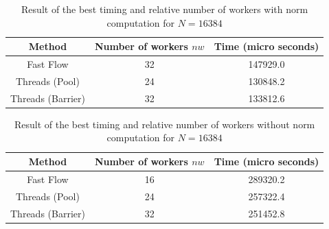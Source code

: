 \documentclass[12pt]{extarticle}
\begin{document}
\begin{table}[H]
\setlength{\tabcolsep}{10pt} %
\renewcommand{\arraystretch}{1.2} %
\centering
\begin{tabular}{|ccc|}
\hline
\multicolumn{1}{|c||}{Method}   & \multicolumn{1}{c|}{Number of workers $nw$}    & \multicolumn{1}{c|}{Time (micro seconds)} \\ \hline
\multicolumn{1}{|c||}{Fast Flow} & \multicolumn{1}{c|}{32} & \multicolumn{1}{c|}{147929.0} \\ \hline
\multicolumn{1}{|c||}{Threads (Pool)}       & \multicolumn{1}{c|}{24} & \multicolumn{1}{c|}{130848.2}  \\ \hline
\multicolumn{1}{|c||}{Threads (Barrier)} & \multicolumn{1}{c|}{32} & 
\multicolumn{1}{c|}{133812.6} \\ \hline
\end{tabular}
\caption{Result of the best timing and relative number of workers with norm computation for $N=16384$}
\end{table}

\begin{table}[H]
\setlength{\tabcolsep}{10pt} %
\renewcommand{\arraystretch}{1.2} %
\centering
\begin{tabular}{|ccc|}
\hline
\multicolumn{1}{|c||}{Method}   & \multicolumn{1}{c|}{Number of workers $nw$}    & \multicolumn{1}{c|}{Time (micro seconds)} \\ \hline
\multicolumn{1}{|c||}{Fast Flow} & \multicolumn{1}{c|}{16} & \multicolumn{1}{c|}{289320.2} \\ \hline
\multicolumn{1}{|c||}{Threads (Pool)}       & \multicolumn{1}{c|}{24} & \multicolumn{1}{c|}{257322.4}  \\ \hline
\multicolumn{1}{|c||}{Threads (Barrier)} & \multicolumn{1}{c|}{32} & 
\multicolumn{1}{c|}{251452.8} \\ \hline
\end{tabular}
\caption{Result of the best timing and relative number of workers without norm computation for $N=16384$}
\end{table}
\end{document}
